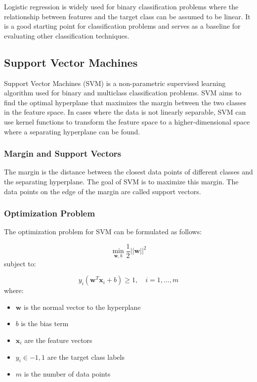 \documentclass[12pt]{article}
\begin{document}
Logistic regression is widely used for binary classification problems where the relationship between features and the target class can be assumed to be linear. It is a good starting point for classification problems and serves as a baseline for evaluating other classification techniques.



\subsection{Support Vector Machines}

Support Vector Machines (SVM) is a non-parametric supervised learning algorithm used for binary and multiclass classification problems. SVM aims to find the optimal hyperplane that maximizes the margin between the two classes in the feature space. In cases where the data is not linearly separable, SVM can use kernel functions to transform the feature space to a higher-dimensional space where a separating hyperplane can be found.

\subsubsection{Margin and Support Vectors}

The margin is the distance between the closest data points of different classes and the separating hyperplane. The goal of SVM is to maximize this margin. The data points on the edge of the margin are called support vectors.

\subsubsection{Optimization Problem}

The optimization problem for SVM can be formulated as follows:

$$\min_{\mathbf{w}, b} \frac{1}{2} ||\mathbf{w}||^2 $$
subject to:

$$ y_i (\mathbf{w}^T \mathbf{x}_i + b) \geq 1, \quad i = 1, \dots, m $$
where:
\begin{itemize}
\item $\mathbf{w}$ is the normal vector to the hyperplane
\item $b$ is the bias term
\item $\mathbf{x}_i$ are the feature vectors
\item $y_i \in {-1, 1}$ are the target class labels
\item $m$ is the number of data points
\end{itemize}
\end{document}
